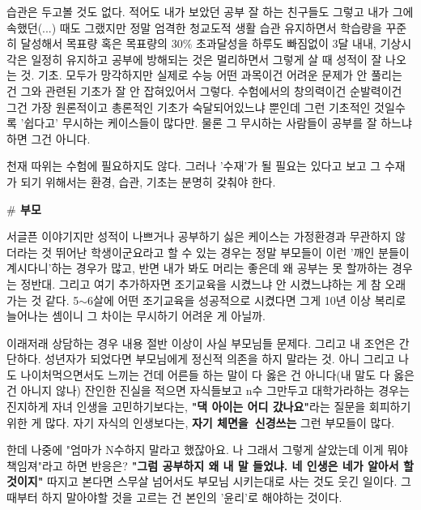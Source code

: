 습관은 두고볼 것도 없다. 적어도 내가 보았던 공부 잘 하는 친구들도 그렇고 내가 그에 속했던(...) 때도 그랬지만
정말 엄격한 청교도적 생활 습관 유지하면서 학습량을 꾸준히 달성해서 목표량 혹은 목표량의 30$\%$ 초과달성을 하루도 빠짐없이 3달 내내,
기상시각은 일정히 유지하고 공부에 방해되는 것은 멀리하면서 그렇게 살 때 성적이 잘 나오는 것.
기초. 모두가 망각하지만 실제로 수능 어떤 과목이건 어려운 문제가 안 풀리는 건 그와 관련된 기초가 잘 안 잡혀있어서 그렇다.
수험에서의 창의력이건 순발력이건 그건 가장 원론적이고 총론적인 기초가 숙달되어있느냐 뿐인데
그런 기초적인 것일수록 '쉽다고' 무시하는 케이스들이 많다만. 물론 그 무시하는 사람들이 공부를 잘 하느냐 하면 그건 아니다.
\vspace{5mm}

천재 따위는 수험에 필요하지도 않다. 그러나 '수재'가 될 필요는 있다고 보고
그 수재가 되기 위해서는 환경, 습관, 기초는 분명히 갖춰야 한다.
\vspace{5mm}

\textbf{$\#$ 부모}
\vspace{5mm}

서글픈 이야기지만 성적이 나쁘거나 공부하기 싫은 케이스는 가정환경과 무관하지 않더라는 것
뛰어난 학생이군요라고 할 수 있는 경우는 정말 부모들이 이런 '깨인 분들이 계시다니'하는 경우가 많고,
반면 내가 봐도 머리는 좋은데 왜 공부는 못 할까하는 경우는 정반대.
그리고 여기 추가하자면 조기교육을 시켰느냐 안 시켰느냐하는 게 참 오래 가는 것 같다.
5$\sim$6살에 어떤 조기교육을 성공적으로 시켰다면 그게 10년 이상 복리로 늘어나는 셈이니 그 차이는 무시하기 어려운 게 아닐까.
\vspace{5mm}

이래저래 상담하는 경우 내용 절반 이상이 사실 부모님들 문제다.
그리고 내 조언은 간단하다. 성년자가 되었다면 부모님에게 정신적 의존을 하지 말라는 것.
아니 그리고 나도 나이처먹으면서도 느끼는 건데 어른들 하는 말이 다 옳은 건 아니다(내 말도 다 옳은 건 아니지 않나)
잔인한 진실을 적으면 자식들보고 n수 그만두고 대학가라하는 경우는
진지하게 자녀 인생을 고민하기보다는, \textbf{"댁 아이는 어디 갔나요"}라는 질문을 회피하기 위한 게 많다.
자기 자식의 인생보다는, \textbf{자기 체면을 신경쓰는} 그런 부모들이 많다.
\vspace{5mm}

한데 나중에 "엄마가 N수하지 말라고 했잖아요. 나 그래서 그렇게 살았는데 이게 뭐야 책임져"라고 하면 반응은?
\textbf{"그럼 공부하지 왜 내 말 들었냐. 네 인생은 네가 알아서 할 것이지"}
따지고 본다면 스무살 넘어서도 부모님 시키는대로 사는 것도 웃긴 일이다.
그 때부터 하지 말아야할 것을 고르는 건 본인의 '윤리'로 해야하는 것이다.
\vspace{5mm}

